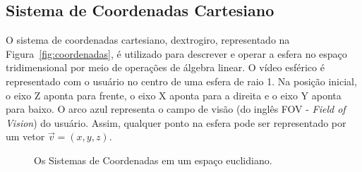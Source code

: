 \subsection{Sistema de Coordenadas Cartesiano}


O sistema de coordenadas cartesiano, dextrogiro, representado na Figura~\ref{fig:coordenadas}, é utilizado para descrever e operar a esfera no espaço tridimensional por meio de operações de álgebra linear. O vídeo esférico é representado com o usuário no centro de uma esfera de raio 1. Na posição inicial, o eixo Z aponta para frente, o eixo X aponta para a direita e o eixo Y aponta para baixo. O arco azul representa o campo de visão (do inglês FOV - \textit{Field of Vision}) do usuário. Assim, qualquer ponto na esfera pode ser representado por um vetor $\overrightarrow{v} = (x,y,z)$.



\begin{figure}[h]
	\centering
	 \quad	 \quad
	\caption{Os Sistemas de Coordenadas em um espaço euclidiano.}
	\label{fig:coord_sis}
\end{figure}

